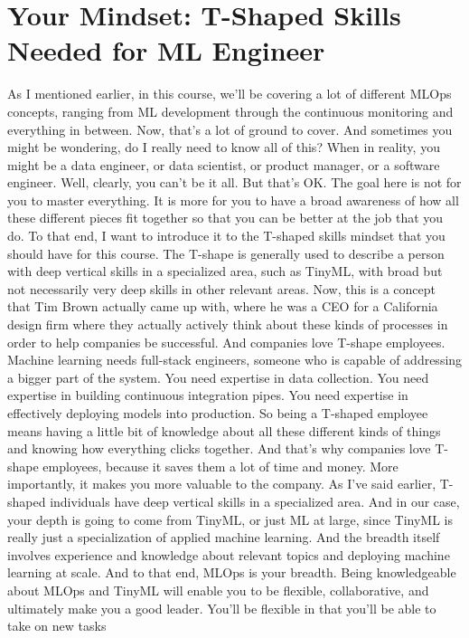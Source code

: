 \section{Your Mindset: T-Shaped Skills Needed for ML Engineer}


As I mentioned earlier, in this course, we'll
be covering a lot of different MLOps concepts, ranging from ML
development through the continuous monitoring and everything in between.
Now, that's a lot of ground to cover.
And sometimes you might be wondering, do I really need to know all of this?
When in reality, you might be a data engineer, or data scientist,
or product manager, or a software engineer.
Well, clearly, you can't be it all.
But that's OK.
The goal here is not for you to master everything.
It is more for you to have a broad awareness
of how all these different pieces fit together so that you can be better
at the job that you do.
To that end, I want to introduce it to the T-shaped skills mindset
that you should have for this course.
The T-shape is generally used to describe a person
with deep vertical skills in a specialized area, such as TinyML,
with broad but not necessarily very deep skills in other relevant areas.
Now, this is a concept that Tim Brown actually came up with,
where he was a CEO for a California design firm
where they actually actively think about these kinds of processes
in order to help companies be successful.
And companies love T-shape employees.
Machine learning needs full-stack engineers,
someone who is capable of addressing a bigger part of the system.
You need expertise in data collection.
You need expertise in building continuous integration pipes.
You need expertise in effectively deploying models into production.
So being a T-shaped employee means having
a little bit of knowledge about all these different kinds of things
and knowing how everything clicks together.
And that's why companies love T-shape employees,
because it saves them a lot of time and money.
More importantly, it makes you more valuable to the company.
As I've said earlier, T-shaped individuals
have deep vertical skills in a specialized area.
And in our case, your depth is going to come from TinyML, or just ML
at large, since TinyML is really just a specialization of applied machine
learning.
And the breadth itself involves experience and knowledge
about relevant topics and deploying machine learning at scale.
And to that end, MLOps is your breadth.
Being knowledgeable about MLOps and TinyML
will enable you to be flexible, collaborative, and ultimately
make you a good leader.
You'll be flexible in that you'll be able to take on new tasks
